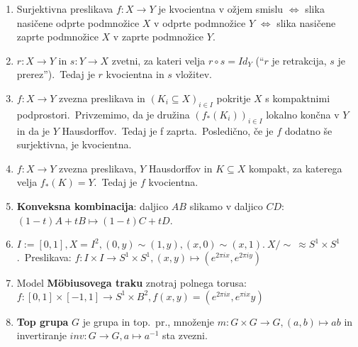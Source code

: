\documentclass[10pt,a4paper]{article}
\begin{document}
\begin{enumerate}
\item Surjektivna preslikava $f: X \rightarrow Y$ je kvocientna v ožjem smislu
    $\Leftrightarrow$ slika nasičene odprte podmnožice $X$ v odprte podmnožice $Y$
    $\Leftrightarrow$ slika nasičene zaprte podmnožice $X$ v zaprte podmnožice $Y$.
    
\item  $r: X \rightarrow Y$ in $s: Y \rightarrow X$ zvetni, za
    kateri velja $r \circ  s = Id_Y$ (``$r$ je retrakcija, $s$ je prerez'').~Tedaj je $r$
    kvocientna in $s$ vložitev.
    
\item  $f : X \rightarrow Y$ zvezna preslikava in $(K_i \subseteq  X)_{i \in I}$ pokritje
    $X$ s kompaktnimi podprostori.~Privzemimo, da je družina $(f_*(K_i))_{i \in I}$
    lokalno končna v $Y$ in da je $Y$ Hausdorffov.~Tedaj je f zaprta.~Posledično,
    če je $f$ dodatno še surjektivna, je kvocientna.
    
\item  $f : X \rightarrow Y$ zvezna preslikava, $Y$ Hausdorffov in $K \subseteq X$
    kompakt, za katerega velja $f_*(K) = Y$.~Tedaj je $f$ kvocientna.
    
\item \textbf{Konveksna kombinacija}: daljico $AB$ slikamo v daljico $CD: $
    $(1-t)A + tB \mapsto (1-t)C + tD$.
    
\item $I := [0, 1], X = I^2, (0, y) \sim (1, y), (x, 0) \sim (x, 1).~X/\sim \
    \approx S^1 \times S^1$.~Preslikava: $f: I \times I \rightarrow S^1 \times S^1,
    (x, y) \mapsto (e^{2 \pi i x}, e^{2 \pi i y})$
    
\item Model \textbf{Möbiusovega traku} znotraj polnega torusa: $f: [0, 1] \times [-1, 1]
    \rightarrow S^1 \times B^2, f(x, y) = (e^{2 \pi i x}, e^{\pi i x}y)$
    
    
    
\item \textbf{Top grupa} $G$ je grupa in top.~pr., množenje $m: G \times
    G \rightarrow G, (a, b) \mapsto ab$ in invertiranje $inv: G \rightarrow G, a
    \mapsto a^{-1}$ sta zvezni.
    

\end{enumerate}
\end{document}
